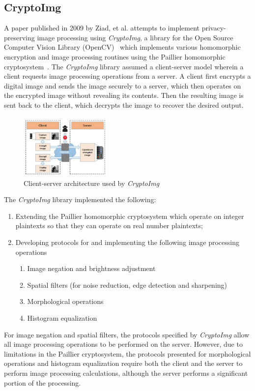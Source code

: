 \subsection{CryptoImg}
A paper published in 2009 by Ziad, et al. attempts to implement privacy-preserving image processing using \textit{CryptoImg}, a library for the Open Source Computer Vision Library (OpenCV)~\cite{bradski_opencv_2000} which implements various homomorphic encryption and image processing routines using the Paillier homomorphic cryptosystem~\cite{ziad_cryptoimg:_2016}. The \textit{CryptoImg} library assumed a client-server model wherein a client requests image processing operations from a server. A client first encrypts a digital image and sends the image securely to a server, which then operates on the encrypted image without revealing its contents. Then the resulting image is sent back to the client, which decrypts the image to recover the desired output.
\begin{figure}[!ht]
    \centering
    \includegraphics[width=0.4\textwidth]{figures/ClientServerModel.png}
    \caption{Client-server architecture used by \textit{CryptoImg} \cite{ziad_cryptoimg:_2016}}
    \label{fig:clientserver}
\end{figure}

The \textit{CryptoImg} library implemented the following:
\begin{enumerate}
	\item Extending the Paillier homomorphic cryptosystem which operate on integer plaintexts so that they can operate on real number plaintexts;
	\item Developing protocols for and implementing the following image processing operations
	\begin{enumerate}
		\item Image negation and brightness adjustment
		\item Spatial filters (for noise reduction, edge detection and sharpening)
		\item Morphological operations
		\item Histogram equalization
	\end{enumerate}
\end{enumerate}
For image negation and spatial filters, the protocols specified by \textit{CryptoImg} allow all image processing operations to be performed on the server. However, due to limitations in the Paillier cryptosystem, the protocols presented for morphological operations and histogram equalization require both the client and the server to perform image processing calculations, although the server performs a significant portion of the processing.

